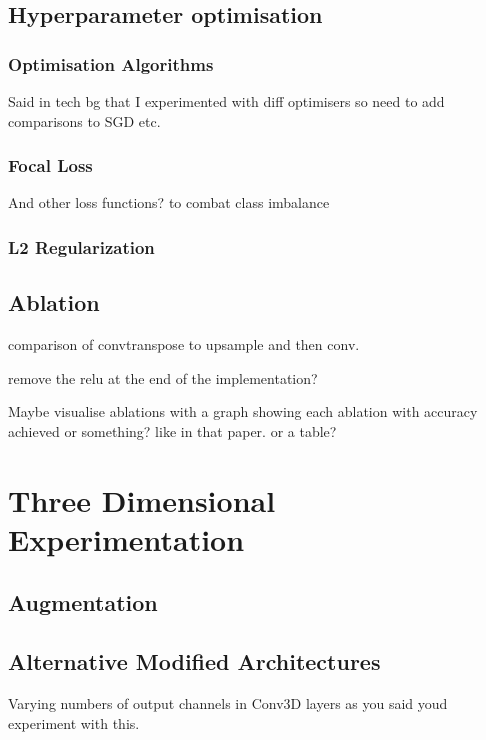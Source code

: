 \subsection{Hyperparameter optimisation}

\subsubsection{Optimisation Algorithms}

Said in tech bg that I experimented with diff optimisers so need to add comparisons to SGD etc.

\subsubsection{Focal Loss}

And other loss functions? to combat class imbalance

\subsubsection{L2 Regularization}

\subsection{Ablation}

comparison of convtranspose to upsample and then conv.

remove the relu at the end of the implementation?

Maybe visualise ablations with a graph showing each ablation with accuracy achieved or something? like in that paper. or a table?

\section{Three Dimensional Experimentation}

\subsection{Augmentation}

\subsection{Alternative Modified Architectures}

Varying numbers of output channels in Conv3D layers as you said youd experiment with this.

